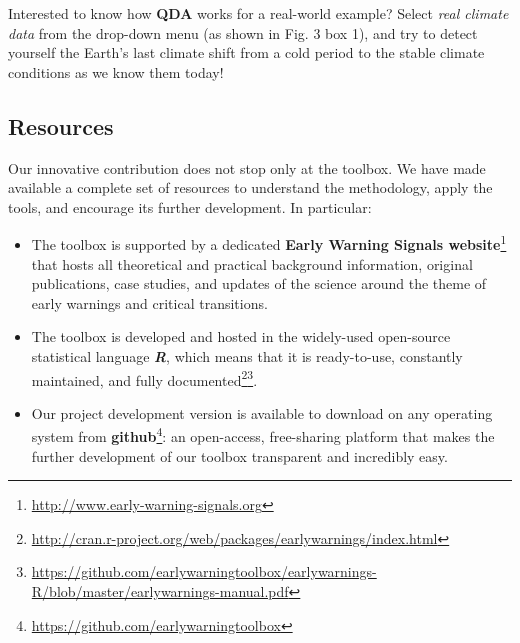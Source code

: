 \documentclass[12pt,a4paper,final]{article}
\begin{document}
\begin{doublespacing}
Interested to know how \textbf{QDA} works for a real-world example? Select \textit{real climate data} from the drop-down menu (as shown in Fig. 3 box 1), and try to detect yourself the Earth's last climate shift from a cold period to the stable climate conditions as we know them today!


\subsection{Resources} 

\label{sec:resources}
Our innovative contribution does not stop only at the toolbox. We have made available a complete set of resources to understand the methodology, apply the tools, and encourage its further development. In particular:
\begin{itemize}
\item The toolbox is supported by a dedicated \textbf{Early Warning Signals website}\footnote{\url{http://www.early-warning-signals.org}} that hosts all theoretical and practical background information, original publications, case studies, and updates of the science around the theme of early warnings and critical transitions. 
\item The toolbox is developed and hosted in the widely-used open-source statistical language \textbf{\textit{R}}, which means that it is ready-to-use, constantly maintained, and fully documented\footnote{\url{http://cran.r-project.org/web/packages/earlywarnings/index.html}}\footnote{\url{https://github.com/earlywarningtoolbox/earlywarnings-R/blob/master/earlywarnings-manual.pdf}}.
 \item Our project development version is available to download on any operating system from \textbf{github}\footnote{\url{https://github.com/earlywarningtoolbox}}: an open-access, free-sharing platform that makes the further development of our toolbox transparent and incredibly easy.
 \end{itemize}



\end{doublespacing}
\end{document}
